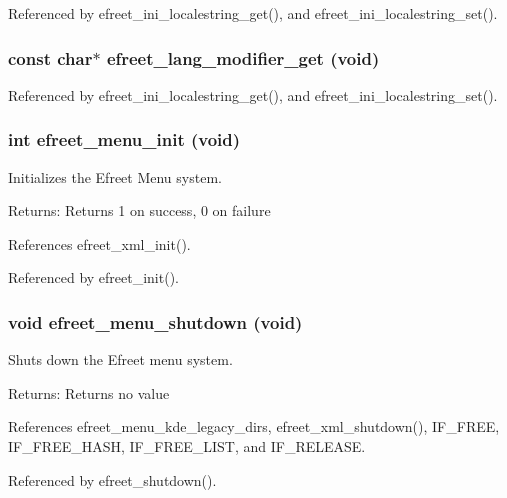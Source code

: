 Referenced by efreet\_\-ini\_\-localestring\_\-get(), and efreet\_\-ini\_\-localestring\_\-set().
\subsubsection{\setlength{\rightskip}{0pt plus 5cm}const char$\ast$ efreet\_\-lang\_\-modifier\_\-get (void)}\label{group__Efreet__Private_g125fc90641f611487330bb7d45f194d1}




Referenced by efreet\_\-ini\_\-localestring\_\-get(), and efreet\_\-ini\_\-localestring\_\-set().
\subsubsection{\setlength{\rightskip}{0pt plus 5cm}int efreet\_\-menu\_\-init (void)}\label{group__Efreet__Private_g0f181489fc48b11061742f56a19f0433}


Initializes the Efreet Menu system. 

\begin{Desc}
\item[Returns:]Returns 1 on success, 0 on failure \end{Desc}


References efreet\_\-xml\_\-init().

Referenced by efreet\_\-init().
\subsubsection{\setlength{\rightskip}{0pt plus 5cm}void efreet\_\-menu\_\-shutdown (void)}\label{group__Efreet__Private_g55e7c0143864a3508da749a7986283f4}


Shuts down the Efreet menu system. 

\begin{Desc}
\item[Returns:]Returns no value \end{Desc}


References efreet\_\-menu\_\-kde\_\-legacy\_\-dirs, efreet\_\-xml\_\-shutdown(), IF\_\-FREE, IF\_\-FREE\_\-HASH, IF\_\-FREE\_\-LIST, and IF\_\-RELEASE.

Referenced by efreet\_\-shutdown().